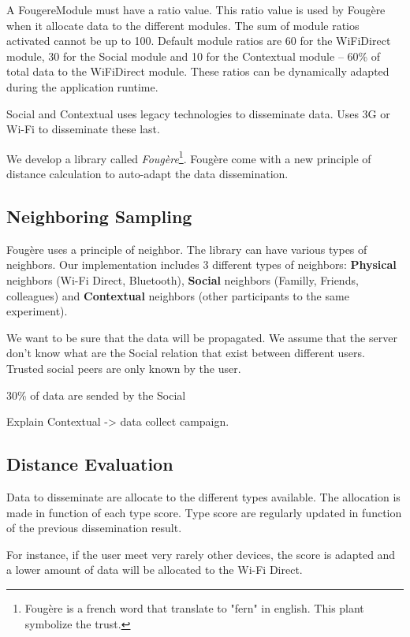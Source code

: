 



A FougereModule must have a ratio value.
This ratio value is used by Foug\`ere when it allocate data to the different modules.
The sum of module ratios activated cannot be up to 100.
Default module ratios are 60 for the WiFiDirect module, 30 for the Social module and 10 for the Contextual module -- 60\% of total data to the WiFiDirect module.
These ratios can be dynamically adapted during the application runtime.


Social and Contextual uses legacy technologies to disseminate data.
Uses 3G or Wi-Fi to disseminate these last.



We develop a library called \textit{Foug\`ere}\footnote{Foug\`ere is a french word that translate to "fern" in english. This plant symbolize the trust.}.
Foug\`ere come with a new principle of distance calculation to auto-adapt the data dissemination.

\subsection{Neighboring Sampling}

Foug\`ere uses a principle of neighbor.
The library can have various types of neighbors.
Our implementation includes 3 different types of neighbors: \textbf{Physical} neighbors (Wi-Fi Direct, Bluetooth), \textbf{Social} neighbors (Familly, Friends, colleagues) and \textbf{Contextual} neighbors (other participants to the same experiment).

We want to be sure that the data will be propagated.
We assume that the server don't know what are the Social relation that exist between different users.
Trusted social peers are only known by the user.

30\% of data are sended by the Social


Explain Contextual -> data collect campaign.

\subsection{Distance Evaluation}

Data to disseminate are allocate to the different types available.
The allocation is made in function of each type score.
Type score are regularly updated in function of the previous dissemination result.

For instance, if the user meet very rarely other devices, the score is adapted and a lower amount of data will be allocated to the Wi-Fi Direct.

